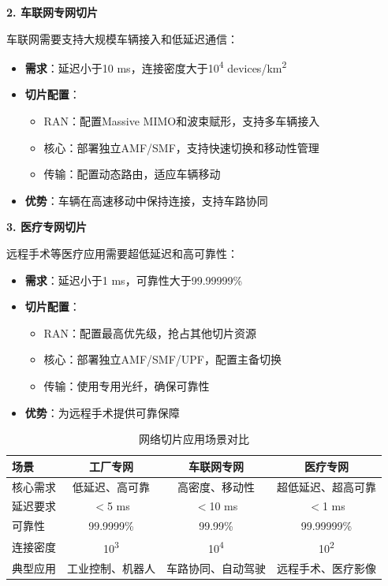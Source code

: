 \textbf{2. 车联网专网切片}

车联网需要支持大规模车辆接入和低延迟通信：

\begin{itemize}
    \item \textbf{需求}：延迟小于10 ms，连接密度大于10\textsuperscript{4} devices/km\textsuperscript{2}
    \item \textbf{切片配置}：
    \begin{itemize}
        \item RAN：配置Massive MIMO和波束赋形，支持多车辆接入
        \item 核心：部署独立AMF/SMF，支持快速切换和移动性管理
        \item 传输：配置动态路由，适应车辆移动
    \end{itemize}
    \item \textbf{优势}：车辆在高速移动中保持连接，支持车路协同
\end{itemize}

\textbf{3. 医疗专网切片}

远程手术等医疗应用需要超低延迟和高可靠性：

\begin{itemize}
    \item \textbf{需求}：延迟小于1 ms，可靠性大于99.99999\%
    \item \textbf{切片配置}：
    \begin{itemize}
        \item RAN：配置最高优先级，抢占其他切片资源
        \item 核心：部署独立AMF/SMF/UPF，配置主备切换
        \item 传输：使用专用光纤，确保可靠性
    \end{itemize}
    \item \textbf{优势}：为远程手术提供可靠保障
\end{itemize}

\begin{table}[htbp]
\centering
\caption{网络切片应用场景对比}
\begin{tabular}{|l|c|c|c|}
\hline
\textbf{场景} & \textbf{工厂专网} & \textbf{车联网专网} & \textbf{医疗专网} \\
\hline
核心需求 & 低延迟、高可靠 & 高密度、移动性 & 超低延迟、超高可靠 \\
延迟要求 & $<$5 ms & $<$10 ms & $<$1 ms \\
可靠性 & 99.9999\% & 99.99\% & 99.99999\% \\
连接密度 & 10\textsuperscript{3} & 10\textsuperscript{4} & 10\textsuperscript{2} \\
典型应用 & 工业控制、机器人 & 车路协同、自动驾驶 & 远程手术、医疗影像 \\
\hline
\end{tabular}
\end{table}

